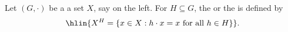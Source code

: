 \begin{definition} \label{definition:fixed_point_set_of_a_group_acting_on_a_set}
Let $(G,\cdot)$ be a  a set $X$, say on the left. 
For $H \subseteq G$, the  or the  is defined by
$$\hlin{X^H = \{ x \in X : h \cdot x = x \text{ for all } h \in H \}}.$$
\end{definition}
